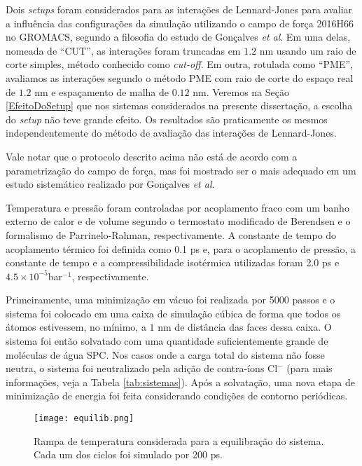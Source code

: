 Dois \textit{setups} foram considerados para as interações de Lennard-Jones para avaliar a influência das configurações da simulação utilizando o campo de força 2016H66\cite{Horta2016} no GROMACS, segundo a filosofia do estudo de Gonçalves \textit{et al}\cite{Goncalvez2018}. 
Em uma delas, nomeada de ``CUT'', as interações foram truncadas em $1.2$ nm usando um raio de corte simples, método conhecido como \textit{cut-off}.
Em outra, rotulada como ``PME'', avaliamos as interações segundo o método PME\cite{Essmann1995} com raio de corte do espaço real de $1.2$ nm e espaçamento de malha de $0.12$ nm.
Veremos na Seção \ref{EfeitoDoSetup} que nos sistemas considerados na presente dissertação, a escolha do \textit{setup} não teve grande efeito.
Os resultados são praticamente os mesmos independentemente do método de avaliação das interações de Lennard-Jones.

Vale notar que o protocolo descrito acima não está de acordo com a parametrização do campo de força, mas foi mostrado ser o mais adequado em um estudo sistemático realizado por Gonçalves \textit{et al}\cite{Goncalvez2018}.

Temperatura e pressão foram controladas por acoplamento fraco com um banho externo de calor e de volume segundo o termostato modificado de Berendsen\cite{Berendsen1984, Bussi2007} e o formalismo de Parrinelo-Rahman\cite{Parrinello1981, Andersen1980}, respectivamente.
A constante de tempo do acoplamento térmico foi definida como 0.1 ps e, para o acoplamento de pressão, a constante de tempo e a compressibilidade isotérmica utilizadas foram 2.0 ps e $4.5\times10^{-5}$bar$^{-1}$, respectivamente.

Primeiramente, uma minimização em vácuo foi realizada por 5000 passos e o sistema foi colocado em uma caixa de simulação cúbica de forma que todos os átomos estivessem, no mínimo, a $1$ nm de distância das faces dessa caixa.
O sistema foi então solvatado com uma quantidade suficientemente grande de moléculas de água SPC\cite{Berendsen1981}.
Nos casos onde a carga total do sistema não fosse neutra, o sistema foi neutralizado pela adição de contra-íons Cl$^{-}$ (para mais informações, veja a Tabela \ref{tab:sistemas}).
Após a solvatação, uma nova etapa de minimização de energia foi feita considerando condições de contorno periódicas.

\begin{figure}[ht]
\centering
\texttt{[image: equilib.png]}
\caption{Rampa de temperatura considerada para a equilibração do sistema. Cada um dos ciclos foi simulado por 200 ps.}
\label{equilib}
\end{figure}

